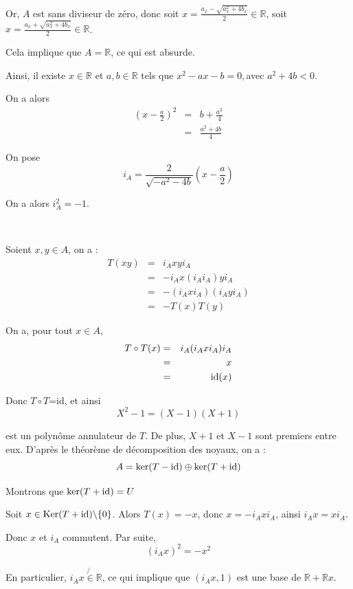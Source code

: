 Or, $A$ est sans diviseur de z{\'e}ro, donc soit $x = \frac{a_x - \sqrt{a_x^2
+ 4 b_x}}{2} \in \mathbb{R}$, soit $x = \frac{a_x + \sqrt{a_x^2 + 4 b_x}}{2}
\in \mathbb{R}$.

Cela implique que $A =\mathbb{R}$, ce qui est absurde.

Ainsi, il existe $x \in \mathbb{R}$ et $a, b \in \mathbb{R}$ tels que $x^2 - a
x - b = 0,$avec $a^2 + 4 b < 0$.

On a alors
\begin{eqnarray*}
  \left( x - \frac{a}{2} \right)^2 & = & b + \frac{a^2}{4}\\
  & = & \frac{a^2 + 4 b}{4}
\end{eqnarray*}


On pose
\[ i_A = \frac{2}{\sqrt{- a^2 - 4 b}} \left( x - \frac{a}{2} \right) \]

On a alors $i^2_A = - 1$.

\

 Soient $x, y \in A$, on a :
\begin{eqnarray*}
  T (x y) & = & i_A x y i_A\\
  & = & - i_A x (i_A i_A) y i_A\\
  & = & - (i_A x i_A) (i_A y i_A)\\
  & = & - T (x) T (y)
\end{eqnarray*}


 On a, pour tout $x \in A$,
\begin{eqnarray*}
  T \circ T (x) & = & i_A (i_A x i_A) i_A\\
  & = & x\\
  & = & \operatorname{id} (x)
\end{eqnarray*}


Donc $T \circ T$=id, et ainsi
\[ X^2 - 1 = (X - 1) (X + 1) \]


est un polyn{\^o}me annulateur de $T$. De plus, $X + 1$ et $X - 1$ sont
premiers entre eux. D'apr{\`e}s le th{\'e}or{\`e}me de d{\'e}composition des
noyaux, on a :
\[ A = \ker (T - \operatorname{id}) \oplus \ker (T + \operatorname{id}) \]

 Montrons que $\ker (T + \operatorname{id}) = U$

Soit $x \in \operatorname{Ker} (T + \operatorname{id}) \backslash \{ 0 \} $. Alors
$T (x) = - x$, donc $x = - i_A x i_A$, ainsi $i_A x = x i_A$.

Donc $x$ et $i_A$ commutent. Par suite,
\[ (i_A x )^2 = - x^2 \]


En particulier, $i_A x \not{\in} \mathbb{R}$, ce qui implique que $(i_A x, 1)$
est une base de $\mathbb{R}+\mathbb{R}x$.

